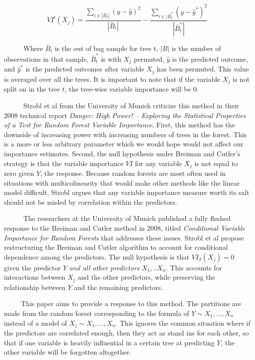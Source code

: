 \documentclass[12pt,twoside]{reedthesis}
\begin{document}
  \[VI^t(X_j) = \frac{\sum_{i \in |\bar{B}_t|} ({y} - \hat{y})^2}{|\bar{B}_t|} - \frac{\sum_{i \in |\bar{B}_t^*} ({y} - \hat{y}^*)^2}{|\bar{B}_t^*|} \]
  
  ~~~~~ Where \(\bar{B}_t\) is the out of bag sample for tree t, \(|B|\)
  is the number of observations in that sample, \(\bar{B}_t^*\) is with
  \(X_j\) permuted, \(\hat{y}\) is the predicted outcome, and
  \(\hat{y}^*\) is the predicted outcomes after variable \(X_j\) has been
  permuted. This value is averaged over all the trees. It is important to
  note that if the variable \(X_j\) is not split on in the tree \(t\), the
  tree-wise variable importance will be 0.
  
  ~~~~~ Strobl et al from the University of Munich criticize this method
  in their 2008 technical report \emph{Danger: High Power! -- Exploring
  the Statistical Properties of a Test for Random Forest Variable
  Importance}. First, this method has the downside of increasing power
  with increasing numbers of trees in the forest. This is a more or less
  arbitrary parameter which we would hope would not affect our importance
  estimates. Second, the null hypothesis under Breiman and Cutler's
  strategy is that the variable importance \(VI\) for any variable \(X_j\)
  is not equal to zero given \(Y\), the response. Because random forests
  are most often used in situations with multicolinearity that would make
  other methods like the linear model difficult, Strobl argues that any
  variable importance measure worth its salt should not be misled by
  correlation within the predictors.
  
  ~~~~~ The researchers at the University of Munich published a fully
  fleshed response to the Breiman and Cutler method in 2008, titled
  \emph{Conditional Variable Importance for Random Forests} that addresses
  these issues. Strobl et al propose restructuring the Breiman and Cutler
  algorithm to account for conditional dependence among the predictors.
  The null hypothesis is that \(VI_{\beta}(X_j) = 0\) given the predictor
  \(Y\) \emph{and all other predictors} \(X_1,..X_n\). This accounts for
  interactions between \(X_j\) and the other predictors, while preserving
  the relationship between \(Y\) and the remaining predictors.
  
  ~~~~~This paper aims to provide a response to this method. The
  partitions are made from the random forest corresponding to the formula
  of \(Y \sim X_1,...,X_n\) instead of a model of
  \(X_j \sim X_1,...,X_n\). This ignores the common situation where if the
  predictors are correlated enough, then they act as stand ins for each
  other, so that if one variable is heavily influential in a certain tree
  at predicting \(Y\), the other variable will be forgotten altogether.
  
\end{document}
